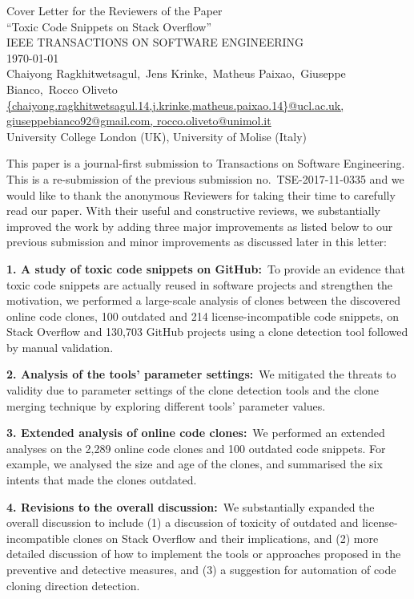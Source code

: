 \documentclass[a4paper,twoside,10pt]{reviewresponse}
\makeatletter
\newcommand{\myAuthors}{Chaiyong Ragkhitwetsagul,~Jens Krinke,~Matheus Paixao,~Giuseppe Bianco,~Rocco Oliveto}
\newcommand{\myEmail}{{chaiyong.ragkhitwetsagul.14,j.krinke,matheus.paixao.14}@ucl.ac.uk, giuseppebianco92@gmail.com, rocco.oliveto@unimol.it}
\newcommand{\myTitle}{Cover Letter for the Reviewers of the Paper \\ ``Toxic Code Snippets on Stack Overflow''}
\newcommand{\myJournal}{IEEE TRANSACTIONS ON SOFTWARE ENGINEERING}
\newcommand{\myDept}{University College London (UK), University of Molise (Italy)}
\makeatother
\begin{document}
\thispagestyle{plain}

\begin{center}
 {\LARGE\myTitle} \vspace{0.3cm} \\
 {\large\myJournal} \vspace{0.3cm} \\
 \today \vspace{0.3cm} \\
 \myAuthors \\
 \url{\myEmail} \\
 \vspace{0.3cm} 
 \myDept \vspace{1cm}
\end{center}


This paper is a journal-first submission to Transactions on Software
Engineering. This is a re-submission of the previous submission
no.~TSE-2017-11-0335 and we would like to thank the anonymous Reviewers for
taking their time to carefully read our paper. With their useful and
constructive reviews, we substantially improved the work by adding three major
improvements as listed below to our previous submission and minor improvements
as discussed later in this letter:

\textbf{1. A study of toxic code snippets on GitHub:}~To provide an evidence
that toxic code snippets are actually reused in software projects and strengthen
the motivation, we performed a large-scale analysis of clones between the
discovered online code clones, 100 outdated and 214 license-incompatible code snippets, 
on Stack Overflow and 130,703 GitHub projects using a clone detection tool followed by manual validation.

\textbf{2. Analysis of the tools' parameter settings:}~We mitigated the threats to
validity due to parameter settings of the clone detection tools and the clone
merging technique by exploring different tools' parameter values.

\textbf{3. Extended analysis of online code clones:}~We performed an extended analyses
on the 2,289 online code clones and 100 outdated code snippets. For example,
we analysed the size and age of the clones, and summarised the six intents that
made the clones outdated.

\textbf{4. Revisions to the overall discussion:}~We substantially expanded the
overall discussion to include (1) a discussion of toxicity of outdated and
license-incompatible clones on Stack Overflow and their implications, and (2) more detailed discussion
of how to implement the tools or approaches proposed in the preventive and
detective measures, and (3) a suggestion for automation of code cloning direction detection.
\end{document}
